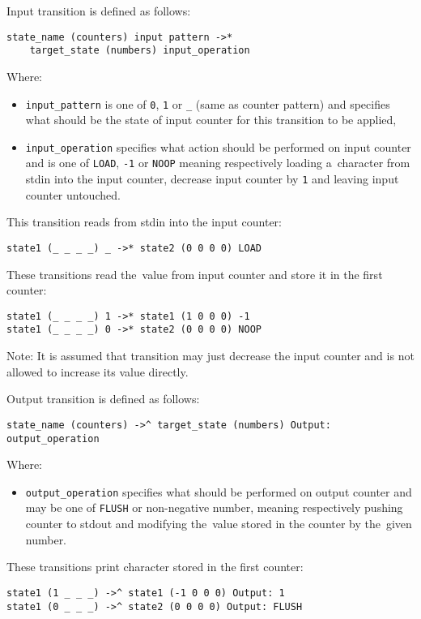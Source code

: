 \documentclass[english,shortabstract,mgr]{iithesis}
\begin{document}
Input transition is defined as follows:
\begin{verbatim}
state_name (counters) input pattern ->*
    target_state (numbers) input_operation
\end{verbatim}

Where:
\begin{itemize}
  \item \texttt{input\_pattern} is one of \texttt{0}, \texttt{1} or \texttt{\_}
      (same as counter pattern) and specifies what should be the state
      of input counter for this transition to be applied,
  \item \texttt{input\_operation} specifies what action should be performed
      on input counter and is one of \texttt{LOAD}, \texttt{-1} or \texttt{NOOP}
      meaning respectively loading a~character from stdin into the input counter,
      decrease input counter by \texttt{1} and leaving input counter untouched.
\end{itemize}

This transition reads from stdin into the input counter:
\begin{verbatim}
state1 (_ _ _ _) _ ->* state2 (0 0 0 0) LOAD
\end{verbatim}

These transitions read the~value from input counter and store it in the first counter:
\begin{verbatim}
state1 (_ _ _ _) 1 ->* state1 (1 0 0 0) -1
state1 (_ _ _ _) 0 ->* state2 (0 0 0 0) NOOP
\end{verbatim}

Note: It is assumed that transition may just decrease the input counter
and is not allowed to increase its value directly.

Output transition is defined as follows:
\begin{verbatim}
state_name (counters) ->^ target_state (numbers) Output: output_operation
\end{verbatim}

Where:
\begin{itemize}
  \item \texttt{output\_operation} specifies what should be performed
      on output counter and may be one of \texttt{FLUSH} or non-negative number,
      meaning respectively pushing counter to stdout and modifying
      the~value stored in the counter by the~given number.
\end{itemize}

These transitions print character stored in the first counter:
\begin{verbatim}
state1 (1 _ _ _) ->^ state1 (-1 0 0 0) Output: 1
state1 (0 _ _ _) ->^ state2 (0 0 0 0) Output: FLUSH
\end{verbatim}
\end{document}
